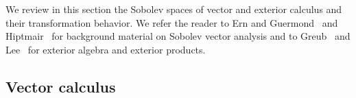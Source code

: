 \documentclass[10pt,a4paper]{article}
\begin{document}

We review in this section the Sobolev spaces of vector and exterior calculus and their transformation behavior. We refer the reader to Ern and Guermond~\cite{ern2021finite} and Hiptmair~\cite{hiptmair2002finite} for background material on Sobolev vector analysis and to Greub~\cite{greub1967multilinear} and Lee~\cite{lee2012smooth} for exterior algebra and exterior products. 

\subsection{Vector calculus}
\end{document}
